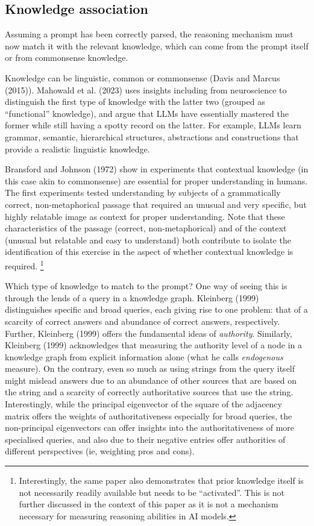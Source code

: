 \documentclass[
]{article}
\theoremstyle{plain}
\theoremstyle{definition}
\theoremstyle{remark}
\begin{document}
\subsection{Knowledge association}\label{knowledge-association}

Assuming a prompt has been correctly parsed, the reasoning mechanism
must now match it with the relevant knowledge, which can come from the
prompt itself or from commonsense knowledge.

Knowledge can be linguistic, common or commonsense (Davis and Marcus
(2015)). Mahowald et al. (2023) uses insights including from
neuroscience to distinguish the first type of knowledge with the latter
two (grouped as ``functional'' knowledge), and argue that LLMs have
essentially mastered the former while still having a spotty record on
the latter. For example, LLMs learn grammar, semantic, hierarchical
structures, abstractions and constructions that provide a realistic
linguistic knowledge.

Bransford and Johnson (1972) show in experiments that contextual
knowledge (in this case akin to commonsense) are essential for proper
understanding in humans. The first experiments tested understanding by
subjects of a grammatically correct, non-metaphorical passage that
required an unusual and very specific, but highly relatable image as
context for proper understanding. Note that these characteristics of the
passage (correct, non-metaphorical) and of the context (unusual but
relatable and easy to understand) both contribute to isolate the
identification of this exercise in the aspect of whether contextual
knowledge is required. \footnote{Interestingly, the same paper also
  demonstrates that prior knowledge itself is not necessarily readily
  available but needs to be ``activated''. This is not further discussed
  in the context of this paper as it is not a mechanism necessary for
  measuring reasoning abilities in AI models.}

Which type of knowledge to match to the prompt? One way of seeing this
is through the lends of a query in a knowledge graph. Kleinberg (1999)
distinguishes specific and broad queries, each giving rise to one
problem: that of a scarcity of correct answers and abundance of correct
answers, respectively. Further, Kleinberg (1999) offers the fundamental
ideas of \emph{authority}. Similarly, Kleinberg (1999) acknowledges that
measuring the authority level of a node in a knowledge graph from
explicit information alone (what he calls \emph{endogenous} measure). On
the contrary, even so much as using strings from the query itself might
mislead answers due to an abundance of other sources that are based on
the string and a scarcity of correctly authoritative sources that use
the string. Interestingly, while the principal eigenvector of the square
of the adjacency matrix offers the weights of authoritativeness
especially for broad queries, the non-principal eigenvectors can offer
insights into the authoritativeness of more specialised queries, and
also due to their negative entries offer authorities of different
perspectives (ie, weighting pros and cons).
\end{document}
